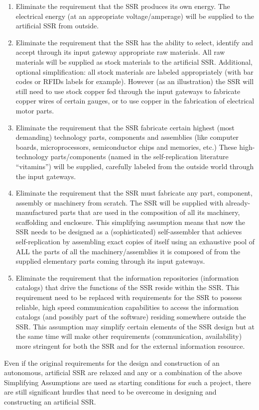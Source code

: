 \documentclass[letterpaper]{article}
\begin{document}
\begin{enumerate}
\item Eliminate the requirement that the SSR produces its own energy.
The electrical energy (at an appropriate voltage/amperage) will be
supplied to the artificial SSR from outside.
\item Eliminate the requirement that the SSR has the ability to select,
identify and accept through its input gateway appropriate raw
materials. All raw materials will be supplied as stock materials to the
artificial SSR. Additional, optional simplification: all stock
materials are labeled appropriately (with bar codes or RFIDs labels for
example). However (as an illustration) the SSR will still need to use
stock copper fed through the input gateways to fabricate copper wires
of certain gauges, or to use copper in the fabrication of electrical
motor parts.
\item Eliminate the requirement that the SSR fabricate certain highest
(most demanding) technology parts, components and assemblies (like
computer boards, microprocessors, semiconductor chips and memories,
etc.) These high-technology parts/components (named in the
self-replication literature “vitamins”) will be supplied, carefully
labeled from the outside world through the input gateways.
\item Eliminate the requirement that the SSR must fabricate any part,
component, assembly or machinery from scratch. The SSR will be supplied
with already-manufactured parts that are used in the composition of all
its machinery, scaffolding and enclosure. This simplifying assumption
means that now the SSR needs to be designed as a (sophisticated)
self-assembler that achieves self-replication by assembling exact
copies of itself using an exhaustive pool of ALL the parts of all the
machinery/assemblies it is composed of from the supplied elementary
parts coming through its input gateways.
\item Eliminate the requirement that the information repositories
(information catalogs) that drive the functions of the SSR reside
within the SSR. This requirement need to be replaced with requirements
for the SSR to possess reliable, high speed communication capabilities
to access the information catalogs (and possibly part of the software)
residing somewhere outside the SSR. This assumption may simplify
certain elements of the SSR design but at the same time will make other
requirements (communication, availability) more stringent for both the
SSR and for the external information resource. 
\end{enumerate}
Even if the original requirements for the design and construction of an
autonomous, artificial SSR are relaxed and any or a combination of the
above Simplifying Assumptions are used as starting conditions for such
a project, there are still significant hurdles that need to be overcome
in designing and constructing an artificial SSR.
\end{document}
